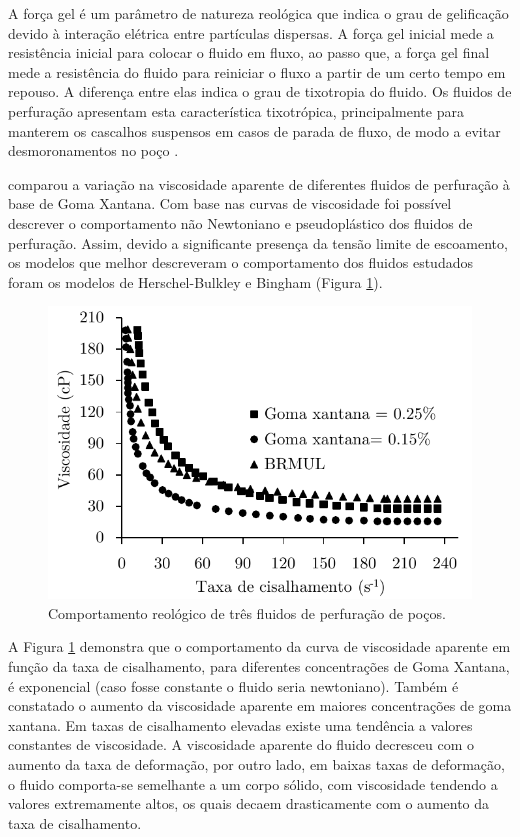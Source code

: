 A força gel é um parâmetro de natureza reológica que indica o grau de gelificação devido à interação elétrica entre partículas dispersas. A força gel inicial mede a resistência inicial para colocar o fluido em fluxo, ao passo que, a força gel final mede a resistência do fluido para reiniciar o fluxo a partir de um certo tempo em repouso. A diferença entre elas indica o grau de tixotropia do fluido. Os fluidos de perfuração apresentam esta característica tixotrópica, principalmente para manterem os cascalhos suspensos em casos de parada de fluxo, de modo a evitar desmoronamentos no poço \cite{pereira}. 

 comparou a variação na viscosidade aparente de diferentes fluidos de perfuração à base de Goma Xantana. Com base nas curvas de viscosidade foi possível descrever o
comportamento não Newtoniano e pseudoplástico dos fluidos de perfuração. Assim, devido a significante presença da
tensão limite de escoamento, os modelos que
melhor descreveram o comportamento dos fluidos
estudados foram os modelos de Herschel-Bulkley
e Bingham (Figura \ref{fig:fluidoperfura}).

\begin{figure}[H]
    \centering
    \includegraphics{Figuras/fluidoperfura.pdf}
    \caption{Comportamento reológico de três fluidos de perfuração de poços.}
    \label{fig:fluidoperfura}
\end{figure}

A Figura \ref{fig:fluidoperfura} demonstra que o comportamento da curva de
viscosidade aparente em função da taxa de
cisalhamento, para diferentes concentrações de Goma Xantana, é exponencial (caso fosse constante o fluido seria newtoniano).
Também é constatado o aumento da viscosidade aparente em maiores
concentrações de goma xantana. Em taxas de cisalhamento elevadas existe uma tendência a valores constantes de viscosidade. A
viscosidade aparente do fluido decresceu com o
aumento da taxa de deformação, por outro lado, em baixas taxas de deformação,
o fluido comporta-se semelhante a um corpo sólido, com viscosidade
tendendo a valores extremamente altos, os quais
decaem drasticamente com o aumento da taxa de cisalhamento.


